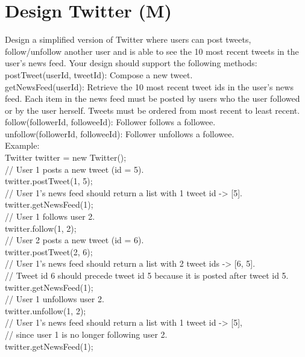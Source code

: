 \section{Design Twitter (M)}
Design a simplified version of Twitter where users can post tweets, follow/unfollow another user and is able to see the 10 most recent tweets in the user's news feed. Your design should support the following methods:\\
    postTweet(userId, tweetId): Compose a new tweet.\\
    getNewsFeed(userId): Retrieve the 10 most recent tweet ids in the user's news feed. Each item in the news feed must be posted by users who the user followed or by the user herself. Tweets must be ordered from most recent to least recent.\\
    follow(followerId, followeeId): Follower follows a followee.\\
    unfollow(followerId, followeeId): Follower unfollows a followee.\\

Example:\\
Twitter twitter = new Twitter();\\

// User 1 posts a new tweet (id = 5).\\
twitter.postTweet(1, 5);\\

// User 1's news feed should return a list with 1 tweet id -> [5].\\
twitter.getNewsFeed(1);\\

// User 1 follows user 2.\\
twitter.follow(1, 2);\\

// User 2 posts a new tweet (id = 6).\\
twitter.postTweet(2, 6);\\

// User 1's news feed should return a list with 2 tweet ids -> [6, 5].\\
// Tweet id 6 should precede tweet id 5 because it is posted after tweet id 5.\\
twitter.getNewsFeed(1);\\

// User 1 unfollows user 2.\\
twitter.unfollow(1, 2);\\

// User 1's news feed should return a list with 1 tweet id -> [5],\\
// since user 1 is no longer following user 2.\\
twitter.getNewsFeed(1);\\

